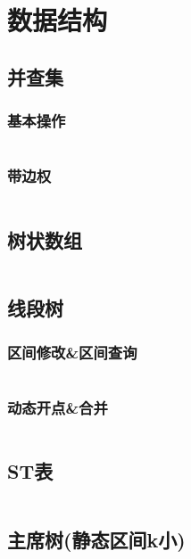 \documentclass[utf8]{ctexart}
\newcommand{\cpp}[1]{\inputminted[linenos,breaklines,tabsize=4,mathescape]{c++}{#1}}
\begin{document}
\newpage

\section{数据结构}

\subsection{并查集}

\subsubsection{基本操作}
\cpp{codes/data-struct/ufs.cpp}

\subsubsection{带边权}
\cpp{codes/data-struct/ufs-with-edge-weight.cpp}

\subsection{树状数组}
\cpp{codes/data-struct/bit.cpp}

\subsection{线段树}

\subsubsection{区间修改\&区间查询}
\cpp{codes/data-struct/segment-tree.cpp}

\subsubsection{动态开点\&合并}
\cpp{codes/data-struct/dynamic-segment-tree.cpp}

\subsection{ST表}
\cpp{codes/data-struct/st.cpp}

\subsection[主席树]{主席树(静态区间k小)}
\cpp{codes/data-struct/hjt-tree.cpp}

\end{document}
